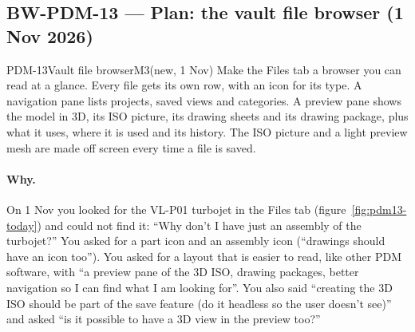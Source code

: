 \subsection{BW-PDM-13 --- Plan: the vault file browser (1 Nov 2026)}\label{sec:pdm13-plan}

\begin{epic}{PDM-13}{Vault file browser}{M3}{\stTodo}{(new, 1 Nov)}
Make the Files tab a browser you can read at a glance. Every file gets its own row, with an icon for its type. A
navigation pane lists projects, saved views and categories. A preview pane shows the model in 3D, its ISO picture,
its drawing sheets and its drawing package, plus what it uses, where it is used and its history. The ISO picture and
a light preview mesh are made off screen every time a file is saved.
\end{epic}

\paragraph{Why.} On 1 Nov you looked for the VL-P01 turbojet in the Files tab (figure~\ref{fig:pdm13-today}) and
could not find it: ``Why don't I have just an assembly of the turbojet?'' You asked for a part icon and an assembly
icon (``drawings should have an icon too''). You asked for a layout that is easier to read, like other PDM software,
with ``a preview pane of the 3D ISO, drawing packages, better navigation so I can find what I am looking for''. You
also said ``creating the 3D ISO should be part of the save feature (do it headless so the user doesn't see)'' and
asked ``is it possible to have a 3D view in the preview too?''

